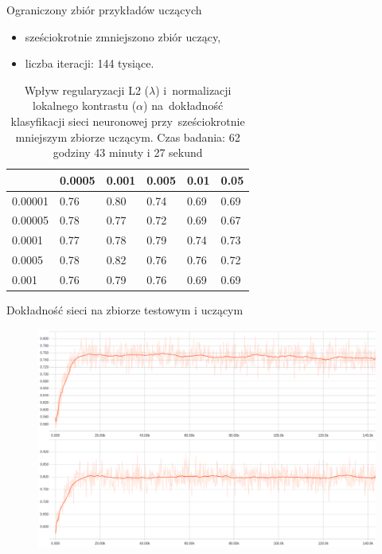 \documentclass[xcolor=dvipsnames]{beamer}
\begin{document}
\begin{frame}{Ograniczony zbiór przykładów uczących}
    \begin{itemize}
        \item sześciokrotnie zmniejszono zbiór uczący,
        \item liczba iteracji: 144 tysiące.
    \end{itemize}
    \begin{table}[H]
        \centering
        \begin{tabular}{|l|l|l|l|l|l|}
            \hline
            \backslashbox{$\alpha$}{$\lambda$} & 0.0005 & \cellcolor{orange!25}0.001 & 0.005 & 0.01 & 0.05 \\
            \hline
            0.00001 & 0.76 & 0.80 & 0.74 & 0.69 & 0.69 \\
            \hline
            0.00005 & 0.78 & 0.77 & 0.72 & 0.69 & 0.67 \\
            \hline
            0.0001  & 0.77 & 0.78 & 0.79 & 0.74 & 0.73 \\
            \hline
            \cellcolor{orange!25}0.0005  & 0.78 & 0.82 & 0.76 & 0.76 & 0.72 \\
            \hline
            0.001   & 0.76 & 0.79 & 0.76 & 0.69 & 0.69 \\
            \hline
        \end{tabular}
        \caption{Wpływ regularyzacji L2 ($\lambda$) i~normalizacji lokalnego kontrastu ($\alpha$) na~dokładność klasyfikacji
        sieci neuronowej przy~sześciokrotnie mniejszym zbiorze uczącym. Czas badania: 62 godziny 43 minuty i 27 sekund}
        \label{table:wyniki3}
    \end{table}
\end{frame}
\begin{frame}{Dokładność sieci na zbiorze testowym i uczącym}
  \begin{figure}
    \includegraphics[width=\textwidth]{img/badanie_3.png}
  \end{figure}
\end{frame}
\end{document}
